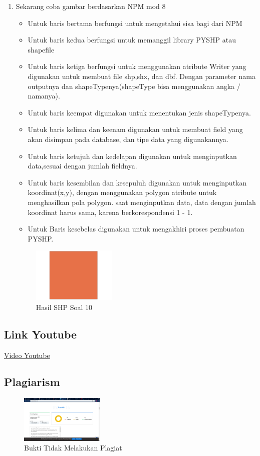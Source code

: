 \begin{enumerate}
	\item Sekarang coba gambar berdasarkan NPM mod 8
	
	\begin{itemize}
		\item Untuk baris bertama berfungsi untuk mengetahui sisa bagi dari NPM
		\item Untuk baris kedua berfungsi untuk memanggil library PYSHP atau shapefile
		\item Untuk baris ketiga berfungsi untuk menggunakan atribute Writer yang digunakan untuk membuat file shp,shx, dan dbf. \hfill\break Dengan parameter nama outputnya dan shapeTypenya(shapeType bisa menggunakan angka / namanya).
		\item Untuk baris keempat digunakan untuk menentukan jenis shapeTypenya.
		\item Untuk baris kelima dan keenam digunakan untuk membuat field yang akan disimpan pada database, dan tipe data yang digunakannya.
		\item Untuk baris ketujuh dan kedelapan digunakan untuk menginputkan data,sesuai dengan jumlah fieldnya.
		\item Untuk baris kesembilan dan kesepuluh digunakan untuk menginputkan koordinat(x,y), dengan menggunakan polygon atribute untuk menghasilkan pola polygon. \hfill\break
		saat menginputkan data, data dengan jumlah koordinat harus sama, karena berkorespondensi 1 - 1.
		\item Untuk Baris kesebelas digunakan untuk mengakhiri proses pembuatan PYSHP.
	\end{itemize}
	\hfill\break
	\begin{figure}[H]
		\includegraphics[width=4cm]{figures/1174002/2/10.png}
		\centering
		\caption{Hasil SHP Soal 10}
	\end{figure}
\end{enumerate}
\subsection{Link Youtube}
\href{https://youtu.be/E1ds9F64WO4}{Video Youtube}
\subsection{Plagiarism}
\begin{figure}[H]
	\includegraphics[width=4cm]{figures/1174002/2/plagiat.png}
	\centering
	\caption{Bukti Tidak Melakukan Plagiat}
\end{figure}
